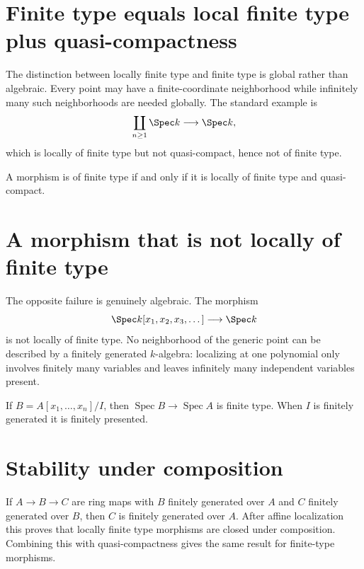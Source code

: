 

\section{Finite type equals local finite type plus quasi-compactness}
The distinction between locally finite type and finite type is global rather than algebraic.  Every point may have
a finite-coordinate neighborhood while infinitely many such neighborhoods are needed globally.  The standard
example is
\[
\coprod_{n\ge1}\Spec k\longrightarrow\Spec k,
\]
which is locally of finite type but not quasi-compact, hence not of finite type.

\begin{theorem}\label{thm:vi26-ft-lft-qc}
A morphism is of finite type if and only if it is locally of finite type and quasi-compact.
\end{theorem}



\section{A morphism that is not locally of finite type}
The opposite failure is genuinely algebraic.  The morphism
\[
\Spec k[x_1,x_2,x_3,\dots]\longrightarrow\Spec k
\]
is not locally of finite type.  No neighborhood of the generic point can be described by a finitely generated
$k$-algebra: localizing at one polynomial only involves finitely many variables and leaves infinitely many
independent variables present.



\begin{example}\label{ex:vi26-expand-02}
If $B=A[x_1,\ldots,x_n]/I$, then $\operatorname{Spec}B\to\operatorname{Spec}A$ is finite type.  When $I$ is finitely generated it is finitely presented.
\end{example}
\section{Stability under composition}
If $A\to B\to C$ are ring maps with $B$ finitely generated over $A$ and $C$ finitely generated over $B$, then
$C$ is finitely generated over $A$.  After affine localization this proves that locally finite type morphisms are
closed under composition.  Combining this with quasi-compactness gives the same result for finite-type morphisms.


